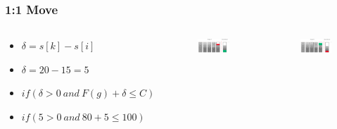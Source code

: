 \documentclass{beamer}
\begin{document}
\begin{frame}
\frametitle{1:1 Move}
\begin{columns}[c] %
\begin{footnotesize}
\begin{itemize}
\item $\delta = s[k]-s[i]$
\item $\delta = 20 - 15 = 5$
\item $if(\delta > 0 \ and \ F(g)+\delta \leq C)$
\item $if(5 > 0 \ and \ 80 + 5 \leq 100)$
\end{itemize}
\end{footnotesize}
\begin{figure}[!htbp]
\begin{center}
\includegraphics[scale=0.15]{img/1zu1_1.png}
\end{center}
\label{fig:architecture}
\end{figure}
\begin{figure}[!htbp]
\begin{center}
\includegraphics[scale=0.15]{img/1zu1_2.png}
\end{center}
\label{fig:architecture}
\end{figure}
\end{columns}
\end{frame}
\end{document}
